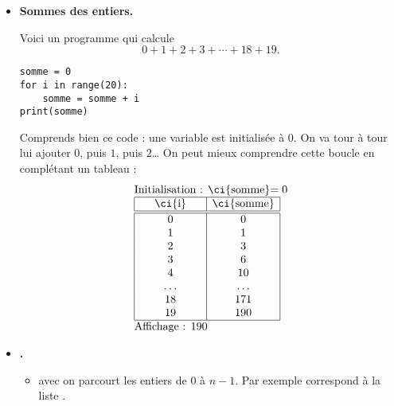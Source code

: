 \documentclass[11pt,class=report,crop=false]{standalone}
\begin{document}
\begin{cours}
\begin{itemize}
  \item \textbf{Sommes des entiers.}

Voici un programme qui calcule 
$$0+1+2+3+\cdots + 18 +19.$$

\begin{center}
\begin{minipage}{0.5\textwidth} 
\begin{lstlisting}
somme = 0
for i in range(20):
    somme = somme + i
print(somme)
\end{lstlisting}
\end{minipage}
\end{center} 

Comprends bien ce code : une variable  est initialisée à $0$. 
On va tour à tour lui ajouter $0$, puis $1$, puis $2$\ldots{}
On peut mieux comprendre cette boucle en complétant un tableau :
  $$
  \begin{array}{l}
  \text{Initialisation : \ci{somme}$=0$}    \\
  \begin{array}{|c|c|}
  \hline  
   \text{\ci{i}} &  \text{\ci{somme}} \\
  \hline\hline
  0 & 0 \\  
  1 & 1 \\
  2 & 3 \\
  3 & 6 \\
  4 & 10\\
  \hspace*{5ex}\ldots\hspace*{5ex} & \hspace*{5ex}\ldots\hspace*{5ex} \\
  18 & 171 \\
  19 & 190 \\ 
  \hline
  \end{array} \\
  \text{Affichage : $190$}  
  \end{array} 
  $$ 
\end{itemize} 

\mybox
{ 
 \begin{itemize}
 \item \textbf{.}
	\begin{itemize}
	  \item avec  on parcourt les entiers de $0$ à $n-1$.
	  Par exemple  correspond à la liste \ci{[0, 1, 2, 3, 4, 5, 6, 7, 8, 9]}. 
	  

\end{itemize}
\end{itemize}}
\end{cours}
\end{document}
